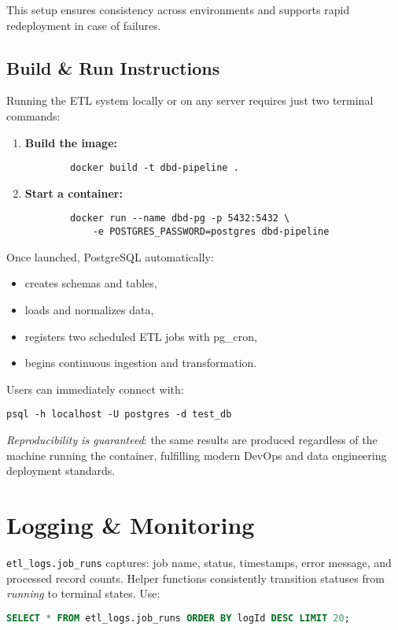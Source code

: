 \documentclass[11pt]{article}
\begin{document}
This setup ensures consistency across environments and supports rapid redeployment in case of failures.


\subsection*{Build \& Run Instructions}

Running the ETL system locally or on any server requires just two terminal commands:

\begin{enumerate}[leftmargin=1.5em]
  \item \textbf{Build the image:}
        \begin{verbatim}
        docker build -t dbd-pipeline .
        \end{verbatim}
  \item \textbf{Start a container:}
        \begin{verbatim}
        docker run --name dbd-pg -p 5432:5432 \
            -e POSTGRES_PASSWORD=postgres dbd-pipeline
        \end{verbatim}
\end{enumerate}

Once launched, PostgreSQL automatically:
\begin{itemize}
\item creates schemas and tables,
\item loads and normalizes data,
\item registers two scheduled ETL jobs with pg\_cron,
\item begins continuous ingestion and transformation.
\end{itemize}

Users can immediately connect with:
\begin{verbatim}
psql -h localhost -U postgres -d test_db
\end{verbatim}

\textit{Reproducibility is guaranteed}: the same results are produced regardless of the machine running the container, fulfilling modern DevOps and data engineering deployment standards.

\section{Logging \& Monitoring}
\texttt{etl\_logs.job\_runs} captures: job name, status, timestamps, error message, and processed record counts. Helper functions consistently transition statuses from \emph{running} to terminal states. Use:
\begin{lstlisting}[language=SQL]
SELECT * FROM etl_logs.job_runs ORDER BY logId DESC LIMIT 20;
\end{lstlisting}
\end{document}
